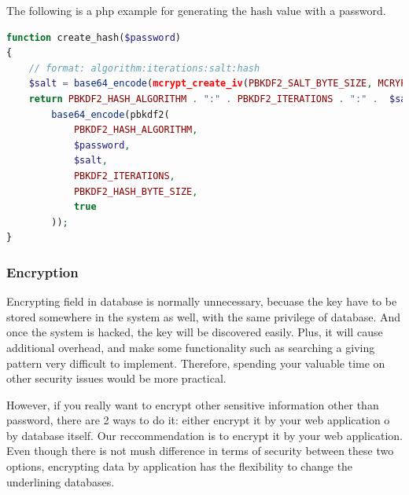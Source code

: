 \documentclass[conference]{IEEEtran}
\begin{document}
The following is a php example \cite{salt_example}
for generating the hash value with a password.
\begin{lstlisting}[language=php]
function create_hash($password)
{
    // format: algorithm:iterations:salt:hash
    $salt = base64_encode(mcrypt_create_iv(PBKDF2_SALT_BYTE_SIZE, MCRYPT_DEV_URANDOM));
    return PBKDF2_HASH_ALGORITHM . ":" . PBKDF2_ITERATIONS . ":" .  $salt . ":" .
        base64_encode(pbkdf2(
            PBKDF2_HASH_ALGORITHM,
            $password,
            $salt,
            PBKDF2_ITERATIONS,
            PBKDF2_HASH_BYTE_SIZE,
            true
        ));
}
\end{lstlisting}

%
%





\subsubsection{Encryption}
Encrypting field in database is normally unnecessary,
becuase the key have to be stored somewhere in the system as well,
with the same privilege of database. And once the system is hacked,
the key will be discovered easily. Plus, it will cause additional
overhead, and make some functionality such as searching a giving pattern
very difficult to implement.
Therefore, spending your valuable time on other security issues
would be more practical.

However, if you really want to encrypt other sensitive information other than password,
there are 2
ways to do it: either encrypt it by your web application o by database itself.
Our reccommendation is to encrypt it by your web application.
Even though there is not mush difference in terms of security between
these two options, encrypting data by application has the flexibility
to change the underlining databases.
\end{document}
